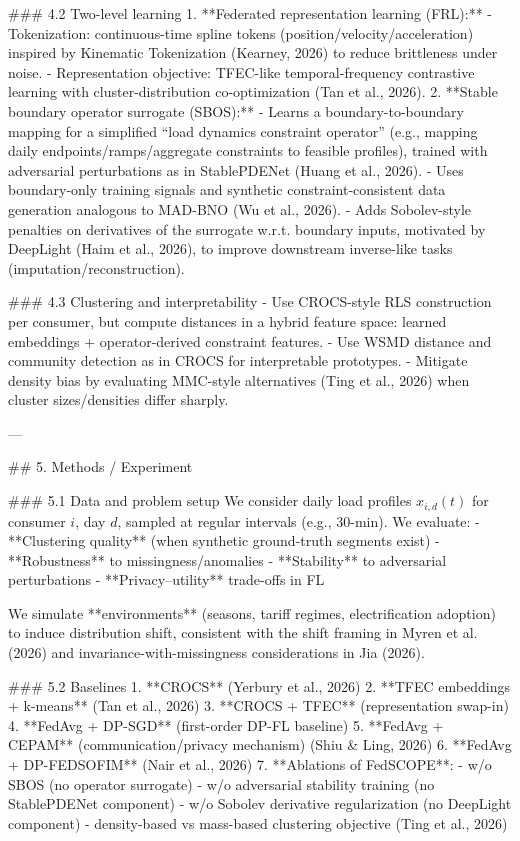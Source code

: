### 4.2 Two-level learning  
1. **Federated representation learning (FRL):**  
   - Tokenization: continuous-time spline tokens (position/velocity/acceleration) inspired by Kinematic Tokenization (Kearney, 2026) to reduce brittleness under noise.  
   - Representation objective: TFEC-like temporal-frequency contrastive learning with cluster-distribution co-optimization (Tan et al., 2026).  
2. **Stable boundary operator surrogate (SBOS):**  
   - Learns a boundary-to-boundary mapping for a simplified “load dynamics constraint operator” (e.g., mapping daily endpoints/ramps/aggregate constraints to feasible profiles), trained with adversarial perturbations as in StablePDENet (Huang et al., 2026).  
   - Uses boundary-only training signals and synthetic constraint-consistent data generation analogous to MAD-BNO (Wu et al., 2026).  
   - Adds Sobolev-style penalties on derivatives of the surrogate w.r.t. boundary inputs, motivated by DeepLight (Haim et al., 2026), to improve downstream inverse-like tasks (imputation/reconstruction).

### 4.3 Clustering and interpretability  
- Use CROCS-style RLS construction per consumer, but compute distances in a hybrid feature space: learned embeddings + operator-derived constraint features.  
- Use WSMD distance and community detection as in CROCS for interpretable prototypes.  
- Mitigate density bias by evaluating MMC-style alternatives (Ting et al., 2026) when cluster sizes/densities differ sharply.

---

## 5. Methods / Experiment  

### 5.1 Data and problem setup  
We consider daily load profiles \(x_{i,d}(t)\) for consumer \(i\), day \(d\), sampled at regular intervals (e.g., 30-min). We evaluate:  
- **Clustering quality** (when synthetic ground-truth segments exist)  
- **Robustness** to missingness/anomalies  
- **Stability** to adversarial perturbations  
- **Privacy–utility** trade-offs in FL

We simulate **environments** (seasons, tariff regimes, electrification adoption) to induce distribution shift, consistent with the shift framing in Myren et al. (2026) and invariance-with-missingness considerations in Jia (2026).

### 5.2 Baselines  
1. **CROCS** (Yerbury et al., 2026)  
2. **TFEC embeddings + k-means** (Tan et al., 2026)  
3. **CROCS + TFEC** (representation swap-in)  
4. **FedAvg + DP-SGD** (first-order DP-FL baseline)  
5. **FedAvg + CEPAM** (communication/privacy mechanism) (Shiu & Ling, 2026)  
6. **FedAvg + DP-FEDSOFIM** (Nair et al., 2026)  
7. **Ablations of FedSCOPE**:  
   - w/o SBOS (no operator surrogate)  
   - w/o adversarial stability training (no StablePDENet component)  
   - w/o Sobolev derivative regularization (no DeepLight component)  
   - density-based vs mass-based clustering objective (Ting et al., 2026)

